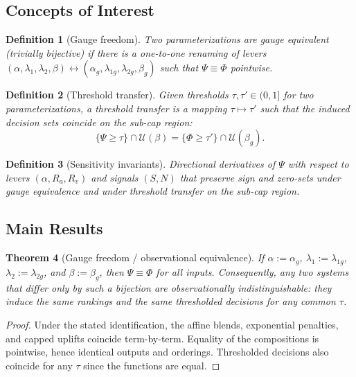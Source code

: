 \documentclass[12pt,a4paper]{article}
\newtheorem{theorem}{Theorem}
\newtheorem{definition}[theorem]{Definition}
\begin{document}
\subsection{Concepts of Interest}
\begin{definition}[Gauge freedom]
Two parameterizations are gauge equivalent (trivially bijective) if there is a one-to-one renaming of levers $(\alpha,\lambda_1,\lambda_2,\beta) \leftrightarrow (\alpha_g,\lambda_{1g},\lambda_{2g},\beta_g)$ such that $\Psi \equiv \Phi$ pointwise.
\end{definition}

\begin{definition}[Threshold transfer]
Given thresholds $\tau,\tau'\in(0,1]$ for two parameterizations, a threshold transfer is a mapping $\tau\mapsto\tau'$ such that the induced decision sets coincide on the sub-cap region:
\[
\{\Psi \ge \tau\}\cap \mathcal{U}(\beta) = \{\Phi \ge \tau'\}\cap \mathcal{U}(\beta_g).
\]
\end{definition}

\begin{definition}[Sensitivity invariants]
Directional derivatives of $\Psi$ with respect to levers $(\alpha,R_a,R_v)$ and signals $(S,N)$ that preserve sign and zero-sets under gauge equivalence and under threshold transfer on the sub-cap region.
\end{definition}

\subsection{Main Results}
\begin{theorem}[Gauge freedom / observational equivalence]\label{thm:gauge-observational}
If $\alpha := \alpha_g$, $\lambda_1 := \lambda_{1g}$, $\lambda_2 := \lambda_{2g}$, and $\beta := \beta_g$, then $\Psi \equiv \Phi$ for all inputs. Consequently, any two systems that differ only by such a bijection are observationally indistinguishable: they induce the same rankings and the same thresholded decisions for any common $\tau$.
\end{theorem}
\begin{proof}
Under the stated identification, the affine blends, exponential penalties, and capped uplifts coincide term-by-term. Equality of the compositions is pointwise, hence identical outputs and orderings. Thresholded decisions also coincide for any $\tau$ since the functions are equal.
\end{proof}
\end{document}
